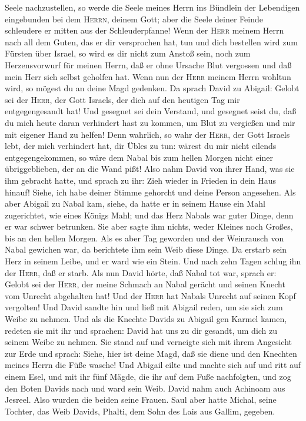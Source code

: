 Seele nachzustellen, so werde die Seele meines Herrn ins Bündlein der
Lebendigen eingebunden bei dem \textsc{Herrn}, deinem Gott; aber die
Seele deiner Feinde schleudere er mitten aus der Schleuderpfanne!
 Wenn der \textsc{Herr} meinem Herrn nach all dem Guten,
das er dir versprochen hat, tun und dich bestellen wird zum Fürsten über
Israel,  so wird es dir nicht zum Anstoß sein, noch zum
Herzensvorwurf für meinen Herrn, daß er ohne Ursache Blut vergossen und
daß mein Herr sich selbst geholfen hat. Wenn nun der \textsc{Herr}
meinem Herrn wohltun wird, so mögest du an deine Magd gedenken.
 Da sprach David zu Abigail: Gelobt sei der
\textsc{Herr}, der Gott Israels, der dich auf den heutigen Tag mir
entgegengesandt hat!  Und gesegnet sei dein Verstand, und
gesegnet seist du, daß du mich heute daran verhindert hast zu kommen, um
Blut zu vergießen und mir mit eigener Hand zu helfen! 
Denn wahrlich, so wahr der \textsc{Herr}, der Gott Israels lebt, der
mich verhindert hat, dir Übles zu tun: wärest du mir nicht eilends
entgegengekommen, so wäre dem Nabal bis zum hellen Morgen nicht einer
übriggeblieben, der an die Wand pißt!  Also nahm David
von ihrer Hand, was sie ihm gebracht hatte, und sprach zu ihr: Zieh
wieder in Frieden in dein Haus hinauf! Siehe, ich habe deiner Stimme
gehorcht und deine Person angesehen.  Als aber Abigail zu
Nabal kam, siehe, da hatte er in seinem Hause ein Mahl zugerichtet, wie
eines Königs Mahl; und das Herz Nabals war guter Dinge, denn er war
schwer betrunken. Sie aber sagte ihm nichts, weder Kleines noch Großes,
bis an den hellen Morgen.  Als es aber Tag geworden und
der Weinrausch von Nabal gewichen war, da berichtete ihm sein Weib diese
Dinge. Da erstarb sein Herz in seinem Leibe, und er ward wie ein Stein.
 Und nach zehn Tagen schlug ihn der \textsc{Herr}, daß er
starb.  Als nun David hörte, daß Nabal tot war, sprach
er: Gelobt sei der \textsc{Herr}, der meine Schmach an Nabal gerächt und
seinen Knecht vom Unrecht abgehalten hat! Und der \textsc{Herr} hat
Nabals Unrecht auf seinen Kopf vergolten! Und David sandte hin und ließ
mit Abigail reden, um sie sich zum Weibe zu nehmen.  Und
als die Knechte Davids zu Abigail gen Karmel kamen, redeten sie mit ihr
und sprachen: David hat uns zu dir gesandt, um dich zu seinem Weibe zu
nehmen.  Sie stand auf und verneigte sich mit ihrem
Angesicht zur Erde und sprach: Siehe, hier ist deine Magd, daß sie diene
und den Knechten meines Herrn die Füße wasche!  Und
Abigail eilte und machte sich auf und ritt auf einem Esel, und mit ihr
fünf Mägde, die ihr auf dem Fuße nachfolgten, und zog den Boten Davids
nach und ward sein Weib.  David nahm auch Achinoam aus
Jesreel. Also wurden die beiden seine Frauen.  Saul aber
hatte Michal, seine Tochter, das Weib Davids, Phalti, dem Sohn des Lais
aus Gallim, gegeben.

